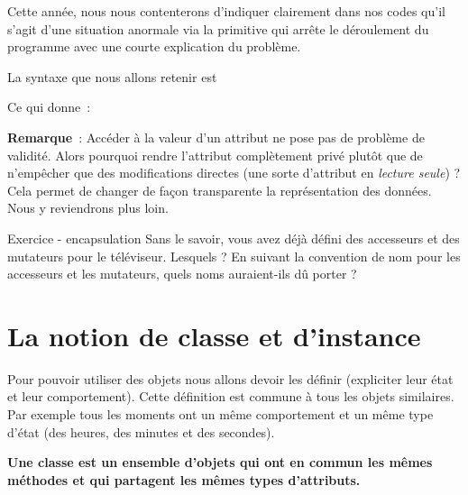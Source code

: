 	Cette année, nous nous contenterons d'indiquer
	clairement dans nos codes qu'il s'agit d'une situation anormale 
	via la primitive  qui arrête le déroulement du
	programme avec une courte explication du problème.

	La syntaxe que nous allons retenir est


	Ce qui donne~:	
	

	\medskip
	\textbf{Remarque}~: 
	Accéder à la valeur d’un attribut ne pose pas 
	de problème de validité. 
	Alors pourquoi rendre l’attribut complètement privé 
	plutôt que de n’empêcher que des modifications directes 
	(une sorte d’attribut en \textit{lecture seule}) ? 
	Cela permet de changer de façon transparente la représentation des données. 
	Nous y reviendrons plus loin.

	\begin{Emphase}{Exercice - encapsulation}
		Sans le savoir, vous avez déjà défini des accesseurs et des 
		mutateurs pour le téléviseur. 
		Lesquels ? 
		En suivant la convention de nom pour les accesseurs et les mutateurs, 
		quels noms auraient-ils dû porter ?
	\end{Emphase}

\section{La notion de classe et d'instance}

	Pour pouvoir utiliser des objets nous allons devoir les définir
	(expliciter leur état et leur comportement). 
	Cette définition est commune à tous les objets similaires. 
	Par exemple tous les moments ont un même comportement 
	et un même type d'état 
	(des heures, des minutes et des secondes).
	
	\textbf{Une \textbf{classe} est un ensemble d'objets qui ont en
	commun les mêmes méthodes et qui partagent les mêmes types
	d'attributs.}

